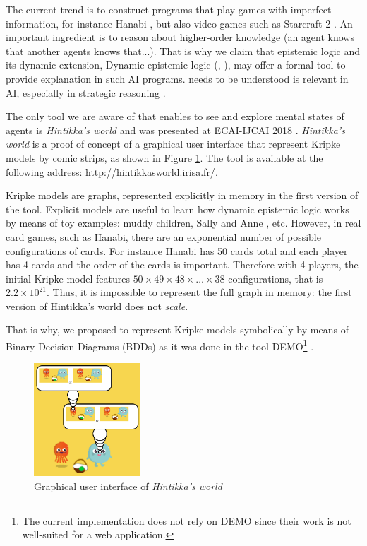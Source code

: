 The current trend is to construct programs that play games with imperfect information, for instance Hanabi \cite{DBLP:journals/corr/abs-1902-00506}, but also video games such as Starcraft 2 \cite{DBLP:conf/ijcai/HuLLPX18}. An important ingredient is to reason about higher-order knowledge (an agent knows that another agents knows that...). That is why we claim that epistemic logic and its dynamic extension, Dynamic epistemic logic (\cite{baltag1998logic}, \cite{DitmarschvdHoekKooi}), may offer a formal tool to provide explanation in such AI programs. needs to be understood is relevant in AI, especially in strategic reasoning \cite{DBLP:journals/ijgt/Aumann99}.

The only tool we are aware of that enables to see and explore mental states of agents is \emph{Hintikka's world} and was presented at ECAI-IJCAI 2018 \cite{DBLP:conf/ijcai/Schwarzentruber18}. 
\emph{Hintikka's world} is a proof of concept of a graphical user interface that represent Kripke models by  comic strips, as shown in Figure \ref{figure:gui}. The tool is available at the following address:
\url{http://hintikkasworld.irisa.fr/}. 


Kripke models are graphs, represented explicitly in memory in the first version of the tool. Explicit models are useful to learn how dynamic epistemic logic works by means of toy examples: muddy children, Sally and Anne  \cite{wimmer1983beliefs}, etc.  However, in real card games, such as Hanabi, there are an exponential number of possible configurations of cards. For instance Hanabi has 50 cards total and each player has 4 cards and the order of the cards is important. Therefore with 4 players, the initial Kripke model features $50 \times 49 \times 48 \times \dots \times 38$ configurations, that is $2.2 \times 10^{21}$. Thus, it is impossible to represent the full graph in memory:  the first version of Hintikka's world does not \emph{scale}. 

That is why, we proposed to represent Kripke models symbolically by means of Binary Decision Diagrams (BDDs) as it was done in the tool DEMO\footnote{The current implementation does not rely on DEMO since their work is not well-suited for a web application.}  \cite{DBLP:conf/lori/BenthemEGS15}. 





\begin{figure}
	\begin{center}
		\includegraphics[width=4cm]{screenshot.png}
	\end{center}
	\caption{Graphical user interface of \emph{Hintikka's world}\label{figure:gui}}
\end{figure}
